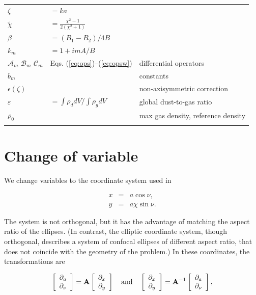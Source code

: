 \documentclass[apj]{emulateapj}
\newcommand{\vt}[1]{\mathbf{#1}}       %
\newcommand{\Eqss}[2]{Eqs. (\ref{#1})--(\ref{#2})}
\newcommand{\eqss}[2]{\Eqss{#1}{#2}}
\newcommand{\beq}{\begin{equation}}
\newcommand{\eeq}{\end{equation}}
\newcommand{\beqn}{\begin{eqnarray}}
\newcommand{\eeqn}{\end{eqnarray}}
\newcommand{\tilchi}{\tilde\chi}
\begin{document}
\begin{table}
\begin{center}
\begin{tabular}{l l l}
$\zeta$ & $=ka$ & \\
$\tilchi$ & $=\frac{\chi^2-1}{2(\chi^2+1)}$ & \\
$\beta$ & $=(B_1-B_2)/4B$& \\
$k_m$ & $= 1+imA/B$ & \\
$\mathcal{A}_m$ $\mathcal{B}_m$ $\mathcal{C}_m$  &\eqss{eq:ops}{eq:opsw} & differential operators \\
$b_m$ & & constants\\
$\epsilon(\zeta)$ & & non-axisymmetric correction \\
$\varepsilon$ & $=\int \rho_d dV/ \int \rho_g dV$ & global dust-to-gas ratio\\
$\rho_0$ & & max gas density, reference density \\
 & & \\ \hline
\end{tabular}
\end{center}
\end{table}


\section{Change of variable}
\label{sect:coordinate-transformation}

We change variables to the coordinate system used in \citet{Chang-Oishi10}

\beqn
  x &=& a \cos\nu, \label{eq:change-x}\\
  y &=& a\chi\sin\nu.  \label{eq:change-y}
\eeqn

The system is not orthogonal, but it has the advantage of matching the
aspect ratio of the ellipses. (In contrast, the elliptic coordinate
system, though orthogonal, describes a system of confocal ellipses of
different aspect ratio, that does not coincide with the geometry of
the problem.) In these coordinates, the transformations are 

\beq
\left[\begin{array}{c}
    \partial_{a}  \\
    \partial_{\nu}
  \end{array}\right] = \vt{A} 
  \left[\begin{array}{c}
      \partial_{x}  \\
      \partial_{y}
    \end{array}\right] 
%
\quad {\rm and} \quad 
%
\left[\begin{array}{c}
    \partial_{x}  \\
    \partial_{y}
  \end{array}\right] = \vt{A}^{-1} 
  \left[\begin{array}{c}
      \partial_{a}  \\
      \partial_{\nu}
    \end{array}\right],  
%
\eeq
\end{document}
